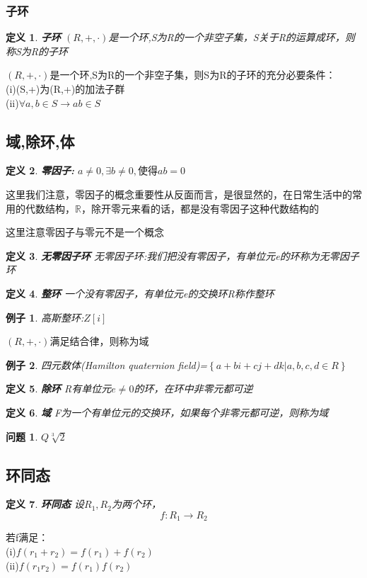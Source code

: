 \documentclass{report}
\newtheorem{definition}{定义}
\newtheorem{example}{例子}[section]
\newtheorem{problem}[exercise]{问题}
\begin{document}
\subsubsection{子环}
\begin{definition}\textbf{子环}
\noindent$(R,+,\cdot)$是一个环,S为R的一个非空子集，S关于R的运算成环，则称S为R的子环
\end{definition}
\noindent$(R,+,\cdot)$是一个环,S为R的一个非空子集，则S为R的子环的充分必要条件：
\\(i)(S,+)为(R,+)的加法子群
\\(ii)$\forall a,b \in S\rightarrow ab \in S $

\subsection{域,除环,体}
\begin{definition}\textbf{零因子:}
$a \neq 0,\exists b \neq 0,使得ab =0$
\end{definition}
这里我们注意，零因子的概念重要性从反面而言，是很显然的，在日常生活中的常用的代数结构，$\mathbb{R}$，除开零元来看的话，都是没有零因子这种代数结构的
\begin{mdframed}
 这里注意零因子与零元不是一个概念
\end{mdframed}
\begin{definition}\textbf{无零因子环}
无零因子环:我们把没有零因子，有单位元e的环称为无零因子环
\end{definition}
\begin{definition}\textbf{整环}
一个没有零因子，有单位元e的交换环R称作整环
\end{definition}
\begin{example}
高斯整环:$Z[i]$
\end{example}
$(R,+,\cdot)$满足结合律，则称为域

\begin{example}
\noindent 四元数体(Hamilton quaternion field)=$\left\{a+bi+cj+dk|a,b,c,d\in R\right\}$
\end{example}
\begin{definition}\textbf{除环}
R有单位元$e \neq 0$的环，在环中非零元都可逆
\end{definition}
\begin{definition}\textbf{域}
F为一个有单位元的交换环，如果每个非零元都可逆，则称为域
\end{definition}
\begin{problem}
$Q \sqrt[3]{2}$
\end{problem}
\subsection{环同态}
\begin{definition}\textbf{环同态}
设$R_{1},R_{2}$为两个环，\\
$$f:R_{1} \rightarrow R_{2}$$
\end{definition}
若f满足：
\\(i)$f(r_{1}+r_{2})=f(r_{1})+f(r_{2})$
\\(ii)$f(r_{1}r_{2})=f(r_{1})f(r_{2})$
\end{document}
